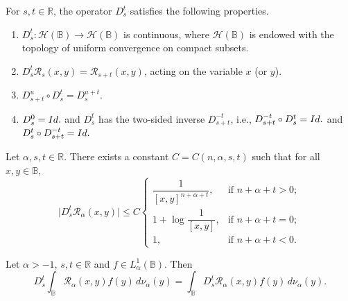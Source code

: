 \documentclass[10pt,a4paper]{amsart}
\begin{document}
\begin{lemma}\label{LPropDst}
For $s,t\in\mathbb R$, the operator $D^t_s$ satisfies the following
properties.
\begin{enumerate}
\item[(i)] $D^t_s:\mathcal H(\mathbb B)\to\mathcal H(\mathbb B)$
is continuous, where $\mathcal H(\mathbb B)$ is endowed with the topology
of uniform convergence on compact subsets.
\item[(ii)] $D^t_s\mathcal R_s(x,y)=\mathcal R_{s+t}(x,y)$,
acting on the variable $x$ (or $y$).
\item[(iii)] $D^{u}_{s+t}\circ D^t_s=D^{u+t}_s$.
\item[(iv)] $D^0_s=\textup{Id}.$ and $D^t_s$ has the two-sided inverse
$D^{-t}_{s+t}$, i.e., $D^{-t}_{s+t}\circ D^t_s=\textup{Id}.$ and
$D^t_s\circ D^{-t}_{s+t}=\textup{Id}.$
\end{enumerate}
\end{lemma}

\begin{theorem}\label{TDstKernel}
Let $\alpha,s,t\in\mathbb R$.
There exists a constant $C=C(n,\alpha,s,t)$ such that for all $x,y\in\mathbb B$,
\begin{equation*}
\vert D^t_s\mathcal R_\alpha(x,y)\vert\le C
\begin{cases}
\dfrac{1}{[x,y]^{n+\alpha+t}},&\text{if $n+\alpha+t>0$};\\
1+\log\dfrac{1}{[x,y]},&\text{if $n+\alpha+t=0$};\\
1,&\text{if $n+\alpha+t<0$}.
\end{cases}
\end{equation*}
\end{theorem}

\begin{lemma}\label{LPushDst}
Let $\alpha>-1$, $s,t\in\mathbb R$ and $f\in L^1_\alpha(\mathbb B)$.
Then
\begin{equation*}
D^t_s \int_{\mathbb B}\mathcal R_\alpha(x,y)f(y)\,d\nu_\alpha(y)
=\int_{\mathbb B}D^t_s \mathcal R_\alpha(x,y)f(y)\,d\nu_\alpha(y).
\end{equation*}
\end{lemma}
\end{document}
